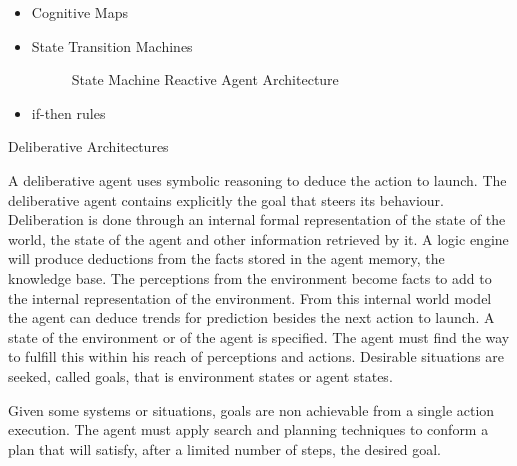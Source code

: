 \documentclass[11pt,oneside,a4paper,openright]{report}
\begin{document}
\begin{description}
\begin{itemize}
		\item Cognitive Maps
		\item State Transition Machines %

		\begin{figure}[h]
		\centering
		\setlength\fboxsep{0pt}
		\setlength\fboxrule{0.5pt}
		\caption{State Machine Reactive Agent Architecture}
		\label{fig:SimTL}
		\end{figure}

		\item if-then rules
	\end{itemize}
	
	\item Deliberative Architectures

	A deliberative agent uses symbolic reasoning to deduce the action to launch. The deliberative agent
	contains explicitly the goal that steers its behaviour. Deliberation is done through an internal formal 
	representation of the state of the world, the state of the agent and other information retrieved by
	it. A logic engine will produce deductions from the facts stored in the agent memory, the knowledge
	base. The perceptions from the environment become facts to add to the internal representation of
	the environment. From this internal world model the agent can deduce trends for prediction besides
	the next action to launch. A state of the environment or of the agent is specified. The agent must find 
	the way to fulfill this within his reach of perceptions and actions. Desirable situations are seeked, 
	called goals, that is environment states or agent states. 

	Given some systems or situations, goals are non achievable from a single action execution. The agent 
	must apply search and planning techniques to conform a plan that will satisfy, after a limited number of 
	steps, the desired goal.


\end{description}
\end{document}
